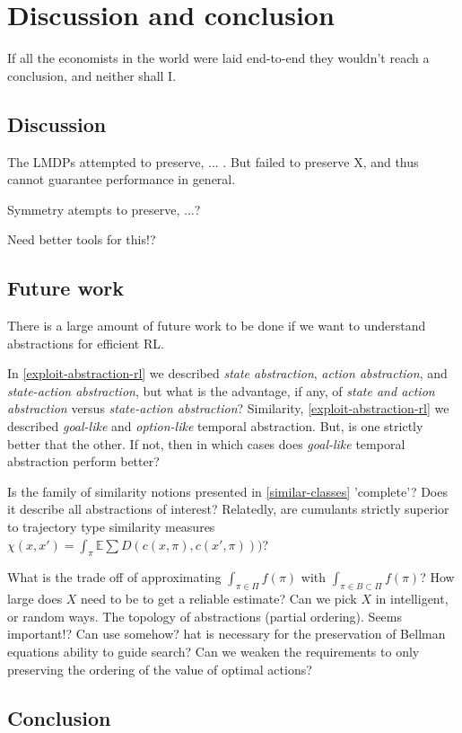\chapter{Discussion and conclusion}\label{C:con}

If all the economists in the world were laid end-to-end they wouldn't
reach a conclusion, and neither shall I.


\section{Discussion}

The LMDPs attempted to preserve, ... . But failed to preserve X, and thus cannot guarantee performance in general.

Symmetry atempts to preserve, ...?

Need better tools for this!?


\section{Future work}

There is a large amount of future work to be done if we want to understand abstractions for efficient RL.

In \ref{exploit-abstraction-rl} we described \textit{state abstraction}, \textit{action abstraction}, and \textit{state-action abstraction}, but what is the advantage, if any, of \textit{state and action abstraction} versus \textit{state-action abstraction}? Similarity, \ref{exploit-abstraction-rl} we described \textit{goal-like} and \textit{option-like} temporal abstraction. But, is one strictly better that the other. If not, then in which cases does \textit{goal-like} temporal abstraction perform better?

Is the family of similarity notions presented in \ref{similar-classes} 'complete'? Does it describe all abstractions of interest?
Relatedly, are cumulants strictly superior to trajectory type similarity measures $\chi(x, x') = \int_\pi \mathbb E \sum D(c(x, \pi), c(x', \pi)))$?

What is the trade off of approximating $\int_{\pi \in \Pi}f(\pi)$ with $\int_{\pi \in B \subset \Pi}f(\pi)$?
How large does $X$ need to be to get a reliable estimate? Can we pick $X$ in intelligent, or random ways.
The topology of abstractions (partial ordering). Seems important!? Can use somehow?
hat is necessary for the preservation of Bellman equations ability to guide search? Can we weaken the requirements to only preserving the ordering of the value of optimal actions?



\section{Conclusion}
